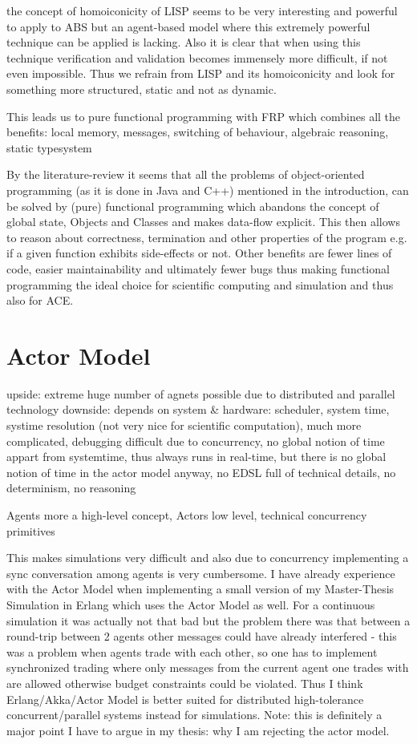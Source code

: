 the concept of homoiconicity of LISP seems to be very interesting and powerful to apply to ABS but an agent-based model where this extremely powerful technique can be applied is lacking. Also it is clear that when using this technique verification and validation becomes immensely more difficult, if not even impossible. Thus we refrain from LISP and its homoiconicity and look for something more structured, static and not as dynamic.

This leads us to pure functional programming with FRP which combines all the benefits: local memory, messages, switching of behaviour, algebraic reasoning, static typesystem

By the literature-review it seems that all the problems of object-oriented programming (as it is done in Java and C++) mentioned in the introduction, can be solved by (pure) functional programming which abandons the concept of global state, Objects and Classes and makes data-flow explicit. This then allows to reason about correctness, termination and other properties of the program e.g. if a given function exhibits side-effects or not. Other benefits are fewer lines of code, easier maintainability and ultimately fewer bugs thus making functional programming the ideal choice for scientific computing and simulation and thus also for ACE.

\section{Actor Model}
upside: extreme huge number of agnets possible due to distributed and parallel technology 
downside: depends on system \& hardware: scheduler, system time, systime resolution (not very nice for scientific computation), much more complicated, debugging difficult due to concurrency, no global notion of time appart from systemtime, thus always runs in real-time, but there is no global notion of time in the actor model anyway, no EDSL full of technical details, no determinism, no reasoning

Agents more a high-level concept, Actors low level, technical concurrency primitives

This makes simulations very difficult and also due to concurrency implementing a sync conversation among agents is very cumbersome. I have already experience with the Actor Model when implementing a small version of my Master-Thesis Simulation in Erlang which uses the Actor Model as well. For a continuous simulation it was actually not that bad but the problem there was that between a round-trip between 2 agents other messages could have already interfered - this was a problem when agents trade with each other, so one has to implement synchronized trading where only messages from the current agent one trades with are allowed otherwise budget constraints could be violated. Thus I think Erlang/Akka/Actor Model is better suited for distributed high-tolerance concurrent/parallel systems instead for simulations. Note: this is definitely a major point I have to argue in my thesis: why I am rejecting the actor model.


